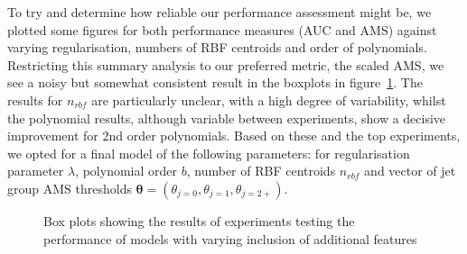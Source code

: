 

To try and determine how reliable our performance assessment might be, we plotted some figures for both performance measures (AUC and AMS) against varying regularisation, numbers of RBF centroids and order of polynomials. Restricting this summary analysis to our preferred metric, the scaled AMS, we see a noisy but somewhat consistent result in the boxplots in figure~\ref{fig:boxes}. The results for $n_{rbf}$ are particularly unclear, with a high degree of variability, whilst the polynomial results, although variable between experiments, show a decisive improvement for 2nd order polynomials. Based on these and the top experiments, we opted for a final model of the following parameters:
for regularisation parameter $\lambda$, polynomial order $b$, number of RBF centroids $n_{rbf}$ and vector of jet group AMS thresholds $\bm{\theta} = (\theta_{j=0}, \theta_{j=1}, \theta_{j=2+})$.

\begin{figure}[htbp]
    \begin{adjustbox}{max width=1.2\linewidth,center}
    \centering
     \hspace*{-0.9em}
     \hspace*{-0.9em}
    \end{adjustbox}
    \caption{Box plots showing the results of experiments testing the performance of models with varying inclusion of additional features}
    \label{fig:boxes}
\end{figure}

